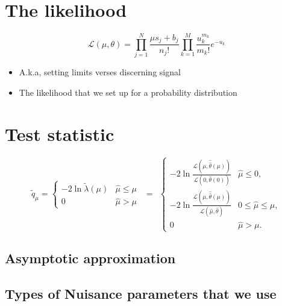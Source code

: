 \section{The likelihood}

\begin{equation}
\mathcal{L}(\mu,\theta) = \prod_{j = 1}^N \frac{ \mu s_j + b_j }{n_j !} \prod_{k = 1}^M \frac{ u_k^{m_k} }{m_k! } e^{-u_k}
\label{eq:likelihood}
\end{equation}

\begin{itemize}
\item A.k.a, setting limits verses discerning signal
\item The likelihood that we set up for a probability distribution
\end{itemize}



\section{Test statistic}


\begin{equation}
    \tilde{q}_\mu = 
    \begin{cases}
        - 2 \ln{\tilde{\lambda}(\mu)} & \hat{\mu} \le \mu \\
        0  & \hat{\mu} > \mu
     \end{cases}
     \ \ =\ \ 
     \begin{cases}
        - 2 \ln{\frac{ \mathcal{L}(\mu, \hat{\hat{\theta}}(\mu))}{\mathcal{L}(0,  \hat{\theta}(0))}} & \hat{\mu} \le 0, \\
        - 2 \ln{\frac{\mathcal{L}(\mu, \hat{\hat{\theta}}(\mu))}{\mathcal{L}(\hat{\mu}, \hat{\theta} ) }} & 0 \le \hat{\mu} \le \mu, \\
        0  & \hat{\mu} > \mu.
     \end{cases}
\end{equation}

\subsection{Asymptotic approximation}

\subsection{Types of Nuisance parameters that we use}


\section{}
